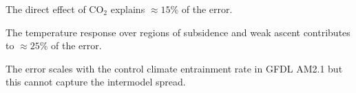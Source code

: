 \documentclass[draft]{agujournal2019}
\begin{document}





\begin{keypoints}
\item The direct effect of CO$_2$ explains $\approx15\%$ of the error.
\item The temperature response over regions of subsidence and weak ascent contributes to $\approx25\%$ of the error.
\item The error scales with the control climate entrainment rate in GFDL AM2.1 but this cannot capture the intermodel spread.
\end{keypoints}

%
%

%
%
\end{document}
